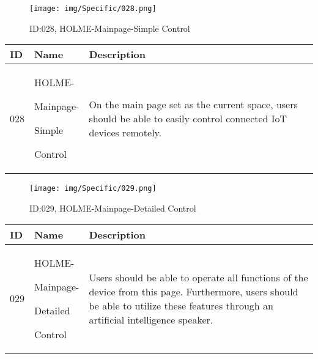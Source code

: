\documentclass[conference]{IEEEtran}
\begin{document}
\begin{enumerate}
\begin{figure}[h]
\centering
\texttt{[image: img/Specific/028.png]}
\caption{ID:028, HOLME-Mainpage-Simple Control}
\end{figure}
\begin{table}[h]
\def\arraystretch{1.2} \small
    \begin{tabular}{|p{1cm}|p{1.8cm}|p{5.0cm}|}
        \hline
        ID & Name & Description\\ \hline
         028 \par  & HOLME-\par Mainpage-\par Simple \par Control &
         On the main page set as the current space, users should be able to easily control connected IoT devices remotely.\\ \hline
    \end{tabular}
\end{table}

\begin{figure}[h]
\centering
\texttt{[image: img/Specific/029.png]}
\caption{ID:029, HOLME-Mainpage-Detailed Control}
\end{figure}
\begin{table}[h]
\def\arraystretch{1.2} \small
    \begin{tabular}{|p{1cm}|p{1.8cm}|p{5.0cm}|}
        \hline
        ID & Name & Description\\ \hline
         029 \par  & HOLME-\par Mainpage-\par Detailed \par Control &
         Users should be able to operate all functions of the device from this page.
         Furthermore, users should be able to utilize these features through an artificial intelligence speaker.\\ \hline
    \end{tabular}
\end{table}


\end{enumerate}
\end{document}
